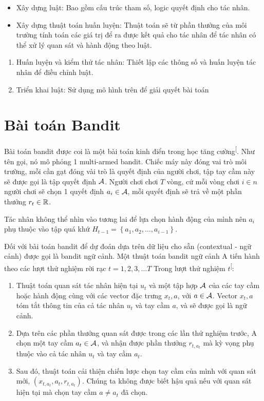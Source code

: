 \documentclass[14pt,oneside]{scrbook}
\providecommand{\tightlist}{\setlength{\itemsep}{\smallskipamount}\setlength{\parskip}{\smallskipamount}}
\begin{document}
\begin{itemize}
\tightlist
\item
  Xây dựng luật: Bao gồm cấu trúc tham số, logic quyết định cho tác
  nhân.
\item
  Xây dựng thuật toán huấn luyện: Thuật toán sẽ từ phần thưởng của môi
  trường tính toán các giá trị để ra được kết quả cho tác nhân để tác
  nhân có thể xử lý quan sát và hành động theo luật.
\end{itemize}

\begin{enumerate}
\def\labelenumi{\arabic{enumi})}
\setcounter{enumi}{3}
\tightlist
\item
  Huấn luyện và kiểm thử tác nhân: Thiết lập các thông số và huấn luyện
  tác nhân để điều chỉnh luật.
\item
  Triển khai luật: Sử dụng mô hình trên để giải quyết bài toán
\end{enumerate}

\section{Bài toán Bandit}\label{buxe0i-touxe1n-bandit}

Bài toán bandit được coi là một bài toán kinh điển trong học tăng
cường\textsuperscript{{[}\citeproc{ref-bandit}{9}{]}}. Như tên gọi, nó
mô phỏng 1 multi-armed bandit. Chiếc máy này đóng vai trò môi trường,
mỗi cần gạt đóng vài trò là quyết định của người chơi, tập tay cầm này
sẽ được gọi là tập quyết định \(\mathcal{A}\). Người chơi chơi \(T\) vòng, cứ mỗi
vòng chơi \(i \in n\) người chơi sẽ chọn 1 quyết định \(a_i \in \mathcal{A}\),
mỗi quyết định sẽ trả về một phần thưởng \(r_t \in \mathbb{R}\).

Tác nhân không thể nhìn vào tương lai để lựa chọn hành động của mình nên
\(a_i\) phụ thuộc vào tập quá khứ
\(H_{t-1}=\left\{a_1,a_2,\ldots,a_{i-1}\right\}\).

Đối với bài toán bandit để dự đoán dựa trên dữ liệu cho sẵn (contextual
- ngữ cảnh) được gọi là bandit ngữ cảnh. Một thuật toán bandit ngữ cảnh
A tiến hành theo các lượt thử nghiệm rời rạc \(t = 1, 2, 3, \ldots T\)
Trong lượt thử nghiệm
\(t\)\textsuperscript{{[}\citeproc{ref-linucb}{10}{]}}:

\begin{enumerate}
\tightlist
\item
  Thuật toán quan sát tác nhân hiện tại \(u_t\) và một tập hợp \(\mathcal{A}\)
  của các tay cầm hoặc hành động cùng với các vector đặc trưng
  \(x_t,a\), với \(a \in \mathcal{A}\). Vector \(x_t,a\) tóm tắt thông tin của cả
  tác nhân \(u_t\) và tay cầm \(a\), và sẽ được gọi là ngữ cảnh.
\item
  Dựa trên các phần thưởng quan sát được trong các lần thử nghiệm trước,
  A chọn một tay cầm \(a_t \in \mathcal{A}\), và nhận được phần thưởng
  \(r_{t,a_t}\) mà kỳ vọng phụ thuộc vào cả tác nhân \(u_t\) và tay cầm
  \(a_t\).
\item
  Sau đó, thuật toán cải thiện chiến lược chọn tay cầm của mình với quan
  sát mới, \((x_{t,a_t}, a_t, r_{t,a_t})\). Chúng ta không được biết hậu
  quả nếu với quan sát hiện tại mà chọn tay cầm \(a \neq a_t\) đã chọn.
\end{enumerate}
\end{document}
